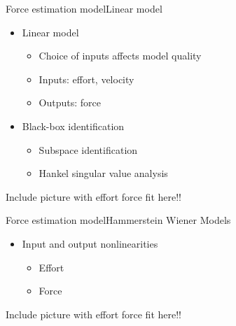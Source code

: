 \begin{frame}{Force estimation model}{Linear model}
\begin{itemize}
\item Linear model
  \begin{itemize}
  \item Choice of inputs affects model quality
  \item Inputs: effort, velocity 
  \item Outputs: force
  \end{itemize}
\item Black-box identification
	\begin{itemize}
	\item Subspace identification
	\item Hankel singular value analysis
	\end{itemize}
\end{itemize}

Include picture with effort force fit here!! 


\end{frame}



\begin{frame}{Force estimation model}{Hammerstein Wiener Models}
\begin{itemize}
\item Input and output nonlinearities
  \begin{itemize}
  \item Effort 
  \item Force
  \end{itemize}
\end{itemize}

Include picture with effort force fit here!! 



\end{frame}




